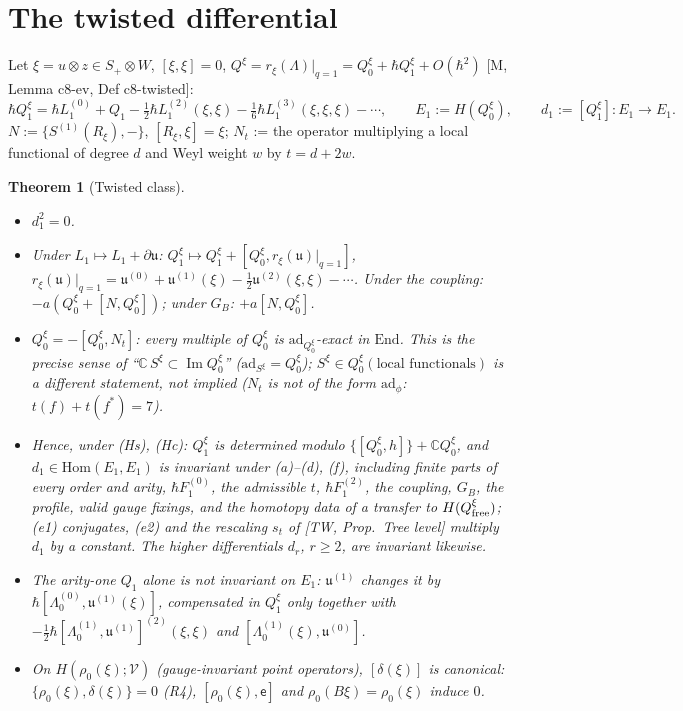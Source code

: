 \documentclass[10pt]{article}
\newtheorem{theorem}{Theorem}[section]
\theoremstyle{definition}
\newcommand{\V}{\mathcal V}
\newcommand{\ad}{\mathrm{ad}}
\newcommand{\End}{\mathrm{End}}
\newcommand{\Hom}{\mathrm{Hom}}
\newcommand{\ee}{\mathsf e}
\begin{document}
\section{The twisted differential}

Let $\xi=u\otimes z\in S_+\otimes W$, $[\xi,\xi]=0$, $Q^\xi=r_\xi(\Lambda)|_{q=1}=Q^\xi_0+\hbar Q^\xi_1+O(\hbar^2)$ [M, Lemma c8-ev, Def c8-twisted]:
\[
\hbar Q^\xi_1=\hbar L_1^{(0)}+Q_1-\tfrac12\hbar L_1^{(2)}(\xi,\xi)-\tfrac16\hbar L_1^{(3)}(\xi,\xi,\xi)-\cdots,\qquad E_1:=H(Q^\xi_0),\qquad d_1:=[Q^\xi_1]:E_1\to E_1 .
\]
$N:=\{S^{(1)}(R_\xi),-\}$, $[R_\xi,\xi]=\xi$; $N_t$ := the operator multiplying a local functional of degree $d$ and Weyl weight $w$ by $t=d+2w$.

\begin{theorem}[Twisted class]\label{thm:tw}\leavevmode
\begin{itemize}
\item[(i)] $d_1^2=0$.
\item[(ii)] Under $L_1\mapsto L_1+\partial\mathfrak u$: $Q^\xi_1\mapsto Q^\xi_1+[Q^\xi_0,r_\xi(\mathfrak u)|_{q=1}]$, $r_\xi(\mathfrak u)|_{q=1}=\mathfrak u^{(0)}+\mathfrak u^{(1)}(\xi)-\tfrac12\mathfrak u^{(2)}(\xi,\xi)-\cdots$. Under the coupling: $-a(Q^\xi_0+[N,Q^\xi_0])$; under $G_B$: $+a[N,Q^\xi_0]$.
\item[(iii)] $Q^\xi_0=-[Q^\xi_0,N_t]$: every multiple of $Q^\xi_0$ is $\ad_{Q^\xi_0}$-exact in $\End$. This is the precise sense of ``$\mathbb C\,S^\xi\subset\operatorname{Im}Q^\xi_0$'' ($\ad_{S^\xi}=Q^\xi_0$); $S^\xi\in Q^\xi_0(\text{local functionals})$ is a different statement, not implied ($N_t$ is not of the form $\ad_\phi$: $t(f)+t(f^*)=7$).
\item[(iv)] Hence, under (Hs), (Hc): $Q^\xi_1$ is determined modulo $\{[Q^\xi_0,h]\}+\mathbb CQ^\xi_0$, and $d_1\in\Hom(E_1,E_1)$ is invariant under (a)--(d), (f), including finite parts of every order and arity, $\hbar F_1^{(0)}$, the admissible $t$, $\hbar F_1^{(2)}$, the coupling, $G_B$, the profile, valid gauge fixings, and the homotopy data of a transfer to $H(Q^\xi_{\rm free})$; (e1) conjugates, (e2) and the rescaling $s_t$ of [TW, Prop.~Tree level] multiply $d_1$ by a constant. The higher differentials $d_r$, $r\ge2$, are invariant likewise.
\item[(v)] The arity-one $Q_1$ alone is not invariant on $E_1$: $\mathfrak u^{(1)}$ changes it by $\hbar[\Lambda_0^{(0)},\mathfrak u^{(1)}(\xi)]$, compensated in $Q^\xi_1$ only together with $-\tfrac12\hbar[\Lambda_0^{(1)},\mathfrak u^{(1)}]^{(2)}(\xi,\xi)$ and $[\Lambda_0^{(1)}(\xi),\mathfrak u^{(0)}]$.
\item[(vi)] On $H(\rho_0(\xi);\V)$ (gauge-invariant point operators), $[\delta(\xi)]$ is canonical: $\{\rho_0(\xi),\delta(\xi)\}=0$ (R4), $[\rho_0(\xi),\ee]$ and $\rho_0(B\xi)=\rho_0(\xi)$ induce $0$.
\end{itemize}
\end{theorem}
\end{document}
